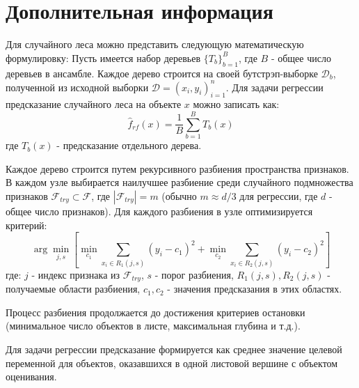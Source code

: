\documentclass{article}
\begin{document}
\section*{Дополнительная информация}
Для случайного леса можно представить следующую математическую формулировку:
Пусть имеется набор деревьев $\{T_b\}_{b=1}^B$, где $B$ - общее число деревьев в ансамбле. Каждое дерево строится на своей бутстрэп-выборке $\mathcal{D}_b$, полученной из исходной выборки $\mathcal{D} = {(x_i, y_i)}_{i=1}^n$.
Для задачи регрессии предсказание случайного леса на объекте $x$ можно записать как:
$$\hat{f}_{rf}(x) = \frac{1}{B}\sum_{b=1}^B T_b(x)$$
где $T_b(x)$ - предсказание отдельного дерева.

Каждое дерево строится путем рекурсивного разбиения пространства признаков. В каждом узле выбирается наилучшее разбиение среди случайного подмножества признаков $\mathcal{F}_{try} \subset \mathcal{F}$, где $|\mathcal{F}_{try}| = m$ (обычно $m \approx d / 3$ для регрессии, где $d$ - общее число признаков).
Для каждого разбиения в узле оптимизируется критерий:
$$\arg \min_{j,s} \left[\min_{c_1}\sum_{x_i \in R_1(j,s)}(y_i - c_1)^2 + \min_{c_2}\sum_{x_i \in R_2(j,s)}(y_i - c_2)^2\right]$$
где: $j$ - индекс признака из $\mathcal{F}_{try}$, $s$ - порог разбиения, $R_1(j,s), R_2(j,s)$ - получаемые области разбиения, $c_1, c_2$ - значения предсказания в этих областях.

Процесс разбиения продолжается до достижения критериев остановки (минимальное число объектов в листе, максимальная глубина и т.д.).

Для задачи регрессии предсказание формируется как среднее значение целевой переменной для объектов, оказавшихся в одной листовой вершине с объектом оценивания.


\clearpage


\end{document}
